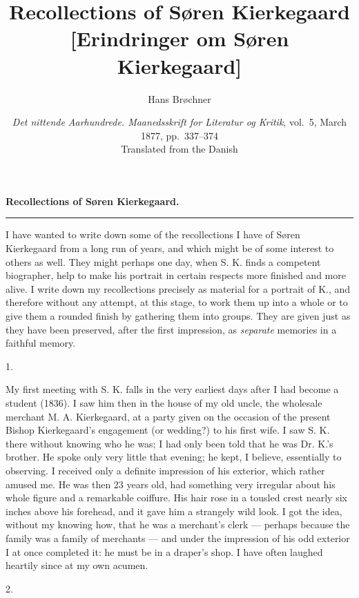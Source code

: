 \documentclass[12pt,a4paper,openany]{book}
\title{\textbf{Recollections of Søren Kierkegaard}\\[8pt]
  \large [Erindringer om Søren Kierkegaard]}
\author{Hans Brøchner}
\date{\textit{Det nittende Aarhundrede. Maanedsskrift for Literatur og
  Kritik}, vol.~5, March 1877, pp.~337--374\\[10pt]
  \small Translated from the Danish}
\newcommand{\secnum}[1]{\par\begin{center}#1\end{center}\par\nobreak}
\newcommand{\opage}[1]{\marginnote{\footnotesize\textit{[#1]}}}
\begin{document}
\maketitle
\thispagestyle{empty}
\clearpage

\begin{center}\textbf{\large \opage{337}Recollections of Søren Kierkegaard.}\\[4pt]\rule{2cm}{0.4pt}\end{center}

I have wanted to write down some of the recollections I
have of Søren Kierkegaard from a long run of years, and
which might be of some interest to others as well. They
might perhaps one day, when S. K. finds a competent biographer,
help to make his portrait in certain respects
more finished and more alive. I write down my recollections
precisely as material for a portrait of K., and
therefore without any attempt, at this stage, to work them
up into a whole or to give them a rounded finish by
gathering them into groups. They are given just as
they have been preserved, after the first impression, as \emph{separate}
memories in a faithful memory.

\secnum{1.}

My first meeting with S. K. falls in the very earliest
days after I had become a student (1836). I saw
him then in the house of my old uncle, the wholesale merchant M. A. Kierkegaard,
at a party given on the occasion of the present
Bishop Kierkegaard's engagement (or wedding?) to his
first wife. I saw S. K. there without knowing who
he was; I had only been told that he was Dr.
K.'s brother. He spoke only very little that evening; he
kept, I believe, essentially to observing. I received only a
\opage{338}definite impression of his exterior, which rather
amused me. He was then 23 years old, had
something very irregular about his whole figure and a
remarkable coiffure. His hair rose in a tousled crest
nearly six inches above his forehead, and it gave him
a strangely wild look. I got the idea, without my
knowing how, that he was a merchant's clerk
--- perhaps because the family was a family of merchants ---
and under the impression of his odd
exterior I at once completed it: he must be in a draper's shop.
I have often laughed heartily since at my own acumen.

\secnum{2.}
\end{document}
